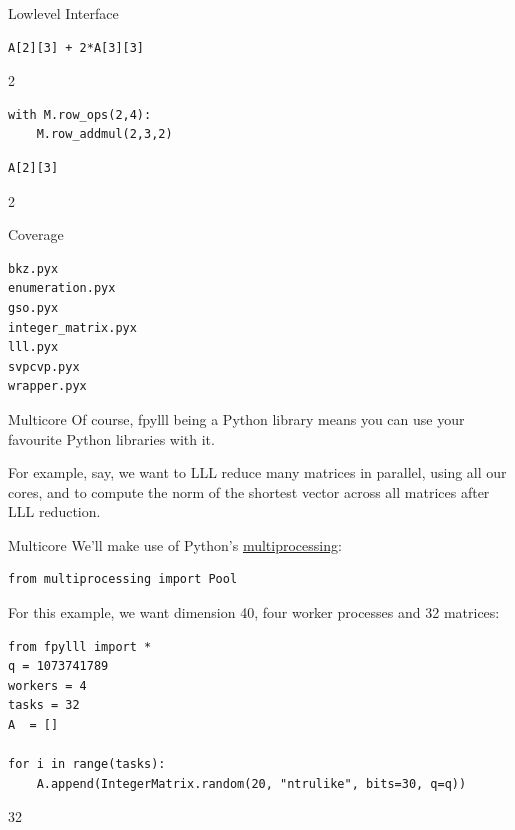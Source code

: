 \documentclass[presentation,smaller]{beamer}
\begin{document}
\begin{frame}[fragile,label={sec:orgheadline8}]{Lowlevel Interface}
 \lstset{language=Python,label= ,caption= ,captionpos=b,numbers=none}
\begin{lstlisting}
A[2][3] + 2*A[3][3]
\end{lstlisting}

2

\lstset{language=Python,label= ,caption= ,captionpos=b,numbers=none}
\begin{lstlisting}
with M.row_ops(2,4):
    M.row_addmul(2,3,2)
\end{lstlisting}

\lstset{language=Python,label= ,caption= ,captionpos=b,numbers=none}
\begin{lstlisting}
A[2][3]
\end{lstlisting}

2
\end{frame}

\begin{frame}[fragile,label={sec:orgheadline9}]{Coverage}
 \begin{verbatim}
bkz.pyx
enumeration.pyx
gso.pyx
integer_matrix.pyx
lll.pyx
svpcvp.pyx
wrapper.pyx
\end{verbatim}
\end{frame}

\begin{frame}[label={sec:orgheadline10}]{Multicore}
Of course, \alert{fpylll} being a Python library means you can use your favourite Python libraries with it. 

For example, say, we want to LLL reduce many matrices in parallel, using all our cores, and to compute the norm of the shortest vector across all matrices after LLL reduction. 
\end{frame}

\begin{frame}[fragile,label={sec:orgheadline11}]{Multicore}
 We’ll make use of Python’s \href{https://docs.python.org/2/library/multiprocessing.html}{multiprocessing}:

\lstset{language=Python,label= ,caption= ,captionpos=b,numbers=none}
\begin{lstlisting}
from multiprocessing import Pool
\end{lstlisting}

For this example, we want dimension 40, four worker processes and 32 matrices:

\lstset{language=Python,label= ,caption= ,captionpos=b,numbers=none}
\begin{lstlisting}
from fpylll import *
q = 1073741789
workers = 4
tasks = 32
A  = []

for i in range(tasks):
    A.append(IntegerMatrix.random(20, "ntrulike", bits=30, q=q))
\end{lstlisting}

32
\end{frame}
\end{document}
